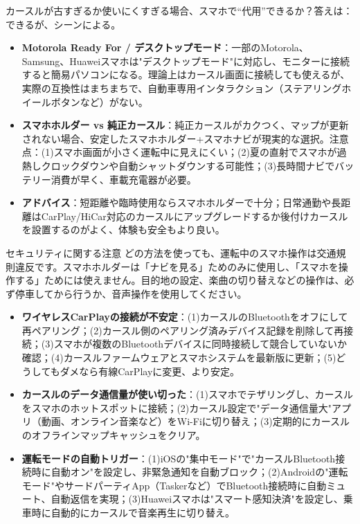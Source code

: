 
カースルが古すぎるか使いにくすぎる場合、スマホで“代用”できるか？答えは：できるが、シーンによる。

\begin{itemize}
  \item \textbf{Motorola Ready For / デスクトップモード}：一部のMotorola、Samsung、Huaweiスマホは"デスクトップモード"に対応し、モニターに接続すると簡易パソコンになる。理論上はカースル画面に接続しても使えるが、実際の互換性はまちまちで、自動車専用インタラクション（ステアリングホイールボタンなど）がない。
  \item \textbf{スマホホルダー vs 純正カースル}：純正カースルがカクつく、マップが更新されない場合、安定したスマホホルダー+スマホナビが現実的な選択。注意点：(1)スマホ画面が小さく運転中に見えにくい；(2)夏の直射でスマホが過熱しクロックダウンや自動シャットダウンする可能性；(3)長時間ナビでバッテリー消費が早く、車載充電器が必要。
  \item \textbf{アドバイス}：短距離や臨時使用ならスマホホルダーで十分；日常通勤や長距離はCarPlay/HiCar対応のカースルにアップグレードするか後付けカースルを設置するのがよく、体験も安全もより良い。
\end{itemize}

\begin{tcbwarn}{セキュリティに関する注意}
どの方法を使っても、運転中のスマホ操作は交通規則違反です。スマホホルダーは「ナビを見る」ためのみに使用し、「スマホを操作する」ためには使えません。目的地の設定、楽曲の切り替えなどの操作は、必ず停車してから行うか、音声操作を使用してください。

\end{tcbwarn}


\begin{itemize}
  \item \textbf{ワイヤレスCarPlayの接続が不安定}：(1)カースルのBluetoothをオフにして再ペアリング；(2)カースル側のペアリング済みデバイス記録を削除して再接続；(3)スマホが複数のBluetoothデバイスに同時接続して競合していないか確認；(4)カースルファームウェアとスマホシステムを最新版に更新；(5)どうしてもダメなら有線CarPlayに変更、より安定。
  \item \textbf{カースルのデータ通信量が使い切った}：(1)スマホでテザリングし、カースルをスマホのホットスポットに接続；(2)カースル設定で"データ通信量大"アプリ（動画、オンライン音楽など）をWi-Fiに切り替え；(3)定期的にカースルのオフラインマップキャッシュをクリア。
  \item \textbf{運転モードの自動トリガー}：(1)iOSの"集中モード"で"カースルBluetooth接続時に自動オン"を設定し、非緊急通知を自動ブロック；(2)Androidの"運転モード"やサードパーティApp（Taskerなど）でBluetooth接続時に自動ミュート、自動返信を実現；(3)Huaweiスマホは"スマート感知決済"を設定し、乗車時に自動的にカースルで音楽再生に切り替え。
\end{itemize}


